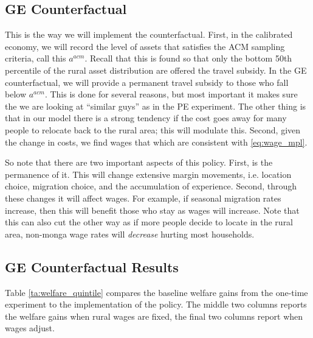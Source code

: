 \documentclass[pdftex,11pt]{article}
\begin{document}
\subsection{GE Counterfactual}

This is the way we will implement the counterfactual. First, in the calibrated economy, we will record the level of assets that satisfies the ACM sampling criteria, call this $a^{acm}$. Recall that this is found so that only the bottom 50th percentile of the rural asset distribution are offered the travel subsidy. In the GE counterfactual, we will provide a permanent travel subsidy to those who fall below $a^{acm}$. This is done for several reasons, but most important it makes sure the we are looking at ``similar guys'' as in the PE experiment. The other thing is that in our model there is a strong tendency if the cost goes away for many people to relocate back to the rural area; this will modulate this. Second, given the change in costs, we find wages that which are consistent with \ref{eq:wage_mpl}.

So note that there are two important aspects of this policy. First, is the permanence of it. This will change extensive margin movements, i.e. location choice, migration choice, and the accumulation of experience. Second, through these changes it will affect wages. For example, if seasonal migration rates increase, then this will benefit those who stay as wages will increase. Note that this can also cut the other way as if more people decide to locate in the rural area, non-monga wage rates will \emph{decrease} hurting most households.

\subsection{GE Counterfactual Results}

Table \ref{ta:welfare_quintile} compares the baseline welfare gains from the one-time experiment to the implementation of the policy. The middle two columns reports the welfare gains when rural wages are fixed, the final two columns report when wages adjust. 
\end{document}
